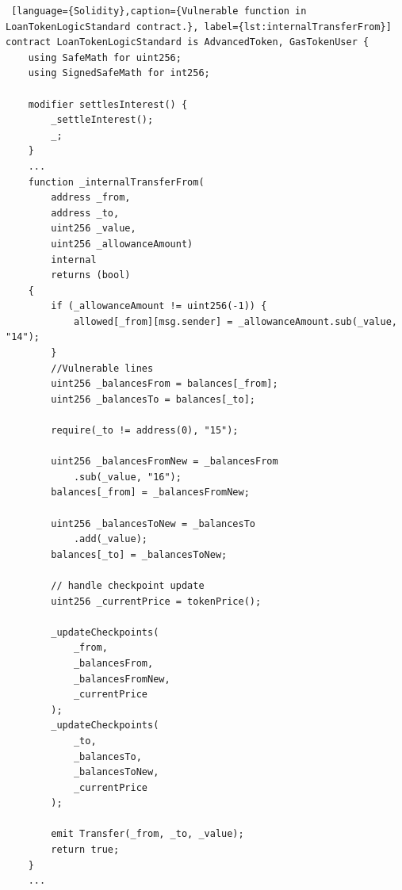 \begin{lstlisting} [language={Solidity},caption={Vulnerable function in LoanTokenLogicStandard contract.}, label={lst:internalTransferFrom}]
contract LoanTokenLogicStandard is AdvancedToken, GasTokenUser {
    using SafeMath for uint256;
    using SignedSafeMath for int256;

    modifier settlesInterest() {
        _settleInterest();
        _;
    }
    ... 
    function _internalTransferFrom(
        address _from,
        address _to,
        uint256 _value,
        uint256 _allowanceAmount)
        internal
        returns (bool)
    {
        if (_allowanceAmount != uint256(-1)) {
            allowed[_from][msg.sender] = _allowanceAmount.sub(_value, "14");
        }
        //Vulnerable lines 
        uint256 _balancesFrom = balances[_from];
        uint256 _balancesTo = balances[_to];

        require(_to != address(0), "15");

        uint256 _balancesFromNew = _balancesFrom
            .sub(_value, "16");
        balances[_from] = _balancesFromNew;

        uint256 _balancesToNew = _balancesTo
            .add(_value);
        balances[_to] = _balancesToNew;

        // handle checkpoint update
        uint256 _currentPrice = tokenPrice();

        _updateCheckpoints(
            _from,
            _balancesFrom,
            _balancesFromNew,
            _currentPrice
        );
        _updateCheckpoints(
            _to,
            _balancesTo,
            _balancesToNew,
            _currentPrice
        );

        emit Transfer(_from, _to, _value);
        return true;
    }
    ... 
\end{lstlisting}

